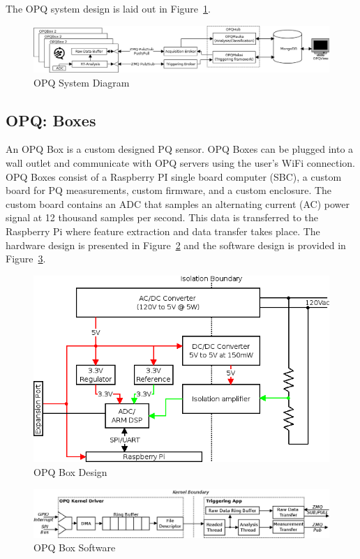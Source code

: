 The OPQ system design is laid out in Figure~\ref{fig:opq-system}.

\begin{figure}
	\centering
	\includegraphics[width=\linewidth]{figures/system-diagram.png}
	\caption{OPQ System Diagram}\label{fig:opq-system}
\end{figure}

\subsection{OPQ: Boxes}\label{subsec:opq:-boxes}
An OPQ Box is a custom designed PQ sensor. OPQ Boxes can be plugged into a wall outlet and communicate with OPQ servers using the user's WiFi connection. OPQ Boxes consist of a Raspberry PI single board computer (SBC), a custom board for PQ measurements, custom firmware, and a custom enclosure. The custom board contains an ADC that samples an alternating current (AC) power signal at 12 thousand samples per second. This data is transferred to the Raspberry Pi where feature extraction and data transfer takes place. The hardware design is presented in Figure~\ref{fig:opq-box-design} and the software design is provided in Figure~\ref{fig:opq-box-software}.

\begin{figure}
	\centering
	\includegraphics[width=.75\linewidth]{figures/opqbox_diagram.png}
	\caption{OPQ Box Design}\label{fig:opq-box-design}
\end{figure}

\begin{figure}
	\centering
	\includegraphics[width=.75\linewidth]{figures/opqbox_software.png}
	\caption{OPQ Box Software}\label{fig:opq-box-software}
\end{figure}

